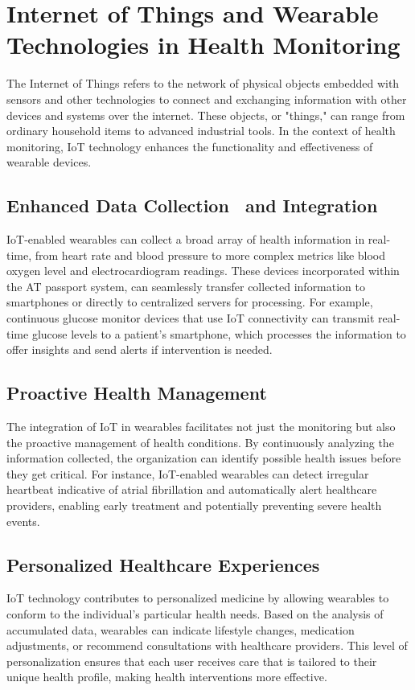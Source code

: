 \section{Internet of Things and Wearable Technologies in Health Monitoring}
The Internet of Things refers to the network of physical objects embedded with
sensors and other technologies to connect and exchanging information with other
devices and systems over the internet. These objects, or "things," can range
from ordinary household items to advanced industrial tools. In the context of
health monitoring, IoT technology enhances the functionality and effectiveness
of wearable devices.

\subsection{Enhanced Data Collection  and Integration}
IoT-enabled wearables can collect a broad array of health information in
real-time, from heart rate and blood pressure to more complex metrics like blood
oxygen level and electrocardiogram readings. These devices incorporated within
the AT passport system, can seamlessly transfer collected information to
smartphones or directly to centralized servers for processing. For example,
continuous glucose monitor devices that use IoT connectivity can transmit
real-time glucose levels to a patient's smartphone, which processes the
information to offer insights and send alerts if intervention is needed.

\subsection{Proactive Health Management}
The integration of IoT in wearables facilitates not just the monitoring but also
the proactive management of health conditions. By continuously analyzing the
information collected, the organization can identify possible health issues
before they get critical. For instance, IoT-enabled wearables can detect
irregular heartbeat indicative of atrial fibrillation and automatically alert
healthcare providers, enabling early treatment and potentially preventing severe
health events.

\subsection{Personalized Healthcare Experiences}
IoT technology contributes to personalized medicine by allowing wearables to
conform to the individual's particular health needs. Based on the analysis of
accumulated data, wearables can indicate lifestyle changes, medication
adjustments, or recommend consultations with healthcare providers. This level of
personalization ensures that each user receives care that is tailored to their
unique health profile, making health interventions more effective.

